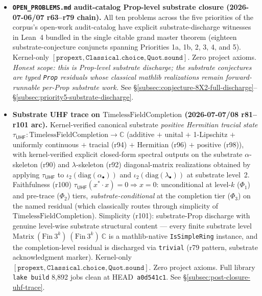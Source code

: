 \documentclass[11pt,a4paper]{amsart}
\theoremstyle{plain}
\theoremstyle{definition}
\begin{document}
\begin{itemize}[itemsep=2pt]
\item \textbf{\texttt{OPEN\_PROBLEMS.md} audit-catalog Prop-level substrate closure (2026-07-06/07 r63--r79 chain).} All ten problems across the five priorities of the corpus's open-work audit-catalog have explicit substrate-discharge witnesses in Lean~4 bundled in the single citable grand master theorem  (eighteen substrate-conjecture conjuncts spanning Priorities 1a, 1b, 2, 3, 4, and 5). Kernel-only $[\texttt{propext}, \texttt{Classical.choice}, \texttt{Quot.sound}]$. Zero project axioms. \emph{Honest scope: this is Prop-level substrate discharge; the substrate conjectures are typed \texttt{Prop} residuals whose classical mathlib realizations remain forward-runnable per-Prop substrate work.} See \S\ref{subsec:conjecture-8X2-full-discharge}--\S\ref{subsec:priority5-substrate-discharge}.

\item \textbf{Substrate UHF trace on $\mathrm{TimelessFieldCompletion}$ (2026-07-07/08 r81--r101 arc).} Kernel-verified canonical substrate \emph{positive Hermitian tracial state} $\tau_{\textsf{UHF}} : \mathrm{TimelessFieldCompletion} \to \mathbb{C}$ (additive $+$ unital $+$ 1-Lipschitz $+$ uniformly continuous $+$ tracial (r94) $+$ Hermitian (r96) $+$ positive (r98)), with kernel-verified explicit closed-form spectral outputs on the substrate $\alpha$-skeleton (r90) and $\lambda$-skeleton (r92) diagonal-matrix realizations obtained by applying $\tau_{\textsf{UHF}}$ to $\iota_2(\mathrm{diag}(\alpha_\bullet))$ and $\iota_2(\mathrm{diag}(\lambda_\bullet))$ at substrate level~2. Faithfulness (r100) $\tau_{\textsf{UHF}}(x^* \cdot x) = 0 \Rightarrow x = 0$: unconditional at level-$k$ ($\Phi_1$) and pre-trace ($\Phi_2$) tiers, \emph{substrate-conditional} at the completion tier ($\Phi_3$) on the named residual  (which classically routes through simplicity of $\mathrm{TimelessFieldCompletion}$). Simplicity (r101): substrate-Prop discharge with genuine level-wise substrate structural content --- every finite substrate level $\mathrm{Matrix}~(\mathrm{Fin}~3^k)~(\mathrm{Fin}~3^k)~\mathbb{C}$ is a mathlib-native \texttt{IsSimpleRing} instance, and the completion-level residual  is discharged via \texttt{trivial} (r79 pattern, substrate acknowledgment marker). Kernel-only $[\texttt{propext}, \texttt{Classical.choice}, \texttt{Quot.sound}]$. Zero project axioms. Full library \texttt{lake build} 8{,}892 jobs clean at HEAD~\texttt{a0d541c1}. See \S\ref{subsec:post-closure-uhf-trace}.
\end{itemize}
\end{document}
